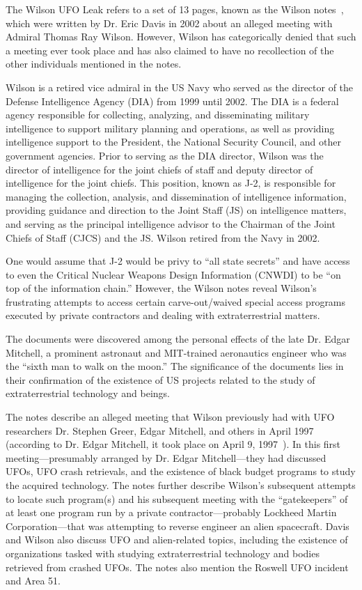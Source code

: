 The Wilson UFO Leak refers to a set of 13 pages, known as the Wilson notes~\cite{WilsonNotes-Davis}, which were written by Dr. Eric Davis in 2002 about an alleged meeting with Admiral Thomas Ray Wilson. However, Wilson has categorically denied that such a meeting ever took place\cite[Chapters9, 21, Ref.9.23]{Coulthart2021Aug} and has also claimed to have no recollection of the other individuals mentioned in the notes\cite{cox20, Cox2021Aug}.

Wilson is a retired vice admiral in the US Navy who served as the director of the Defense Intelligence Agency (DIA) from 1999 until 2002. The DIA is a federal agency responsible for collecting, analyzing, and disseminating military intelligence to support military planning and operations, as well as providing intelligence support to the President, the National Security Council, and other government agencies. Prior to serving as the DIA director, Wilson was the director of intelligence for the joint chiefs of staff and deputy director of intelligence for the joint chiefs. This position, known as J-2, is responsible for managing the collection, analysis, and dissemination of intelligence information, providing guidance and direction to the Joint Staff (JS) on intelligence matters, and serving as the principal intelligence advisor to the Chairman of the Joint Chiefs of Staff (CJCS) and the JS. Wilson retired from the Navy in 2002.

One would assume that J-2 would be privy to ``all state secrets'' and have access to even the Critical Nuclear Weapons Design Information (CNWDI) to be ``on top of the information chain.'' However, the Wilson notes reveal Wilson's frustrating attempts to access certain carve-out/waived special access programs executed by private contractors and dealing with extraterrestrial matters.

The documents were discovered among the personal effects of the late Dr. Edgar Mitchell, a prominent astronaut and MIT-trained aeronautics engineer who was the ``sixth man to walk on the moon.'' The significance of the documents lies in their confirmation of the existence of US projects related to the study of extraterrestrial technology and beings.

The notes describe an alleged meeting that Wilson previously had with UFO researchers Dr. Stephen Greer, Edgar Mitchell, and others in April 1997 (according to Dr. Edgar Mitchell, it took place on April 9, 1997~\cite[p.~1]{WilsonNotes-Davis}). In this first meeting---presumably arranged by Dr. Edgar Mitchell---they had discussed UFOs, UFO crash retrievals, and the existence of black budget programs to study the acquired technology. The notes further describe Wilson's subsequent attempts to locate such program(s) and his subsequent meeting with the ``gatekeepers'' of at least one program run by a private contractor---probably Lockheed Martin Corporation---that was attempting to reverse engineer an alien spacecraft. Davis and Wilson also discuss UFO and alien-related topics, including the existence of organizations tasked with studying extraterrestrial technology and bodies retrieved from crashed UFOs. The notes also mention the Roswell UFO incident and Area 51.

